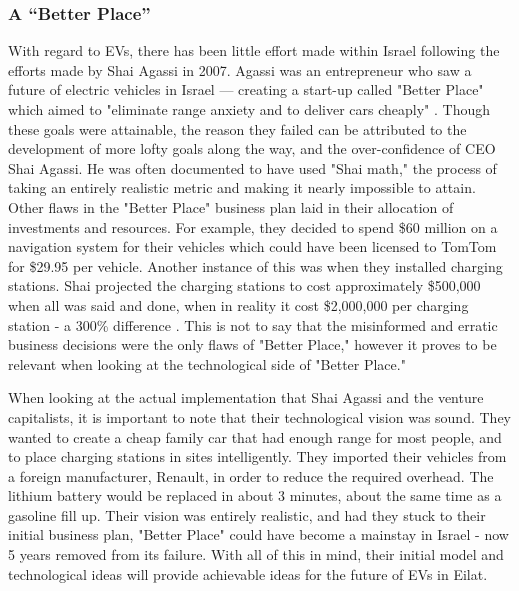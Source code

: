 \documentclass[12pt]{article}                         %
\begin{document}

\subsubsection{A ``Better Place''}
With regard to EVs, there has been little effort made within Israel following the efforts made by Shai Agassi in 2007. Agassi was an entrepreneur who saw a future of electric vehicles in Israel --- creating a start-up called "Better Place" which aimed to "eliminate range anxiety and to deliver cars cheaply" \cite{ChafkinAGoing}. Though these goals were attainable, the reason they failed can be attributed to the development of more lofty goals along the way, and the over-confidence of CEO Shai Agassi. He was often documented to have used "Shai math," the process of taking an entirely realistic metric and making it nearly impossible to attain. Other flaws in the "Better Place" business plan laid in their allocation of investments and resources. For example, they decided to spend \$60 million on a navigation system for their vehicles which could have been licensed to TomTom for \$29.95 per vehicle. Another instance of this was when they installed charging stations. Shai projected the charging stations to cost approximately \$500,000 when all was said and done, when in reality it cost \$2,000,000 per charging station - a 300\% difference \cite{ChafkinAGoing}. This is not to say that the misinformed and erratic business decisions were the only flaws of "Better Place," however it proves to be relevant when looking at the technological side of "Better Place." 

When looking at the actual implementation that Shai Agassi and the venture capitalists, it is important to note that their technological vision was sound. They wanted to create a cheap family car that had enough range for most people, and to place charging stations in sites intelligently. They imported their vehicles from a foreign manufacturer, Renault, in order to reduce the required overhead. The lithium battery would be replaced in about 3 minutes, about the same time as a gasoline fill up. Their vision was entirely realistic, and had they stuck to their initial business plan, "Better Place" could have become a mainstay in Israel - now 5 years removed from its failure. With all of this in mind, their initial model and technological ideas will provide achievable ideas for the future of EVs in Eilat.
\end{document}

